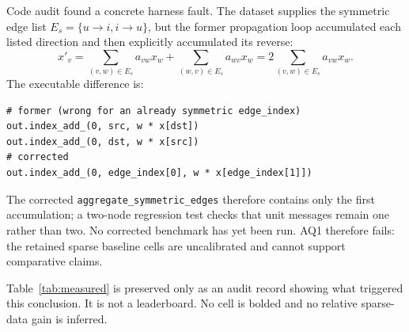 \documentclass[a4paper,fleqn,longmktitle]{cas-dc}
\begin{document}
Code audit found a concrete harness fault. The dataset supplies the symmetric
edge list $E_s=\{u\!\to\!i,i\!\to\!u\}$, but the former propagation loop
accumulated each listed direction and then explicitly accumulated its reverse:
\begin{equation}
 x'_v=\sum_{(v,w)\in E_s}a_{vw}x_w
      +\sum_{(w,v)\in E_s}a_{wv}x_w
      =2\sum_{(v,w)\in E_s}a_{vw}x_w .
 \label{eq:double-count-bug}
\end{equation}
The executable difference is:
\begin{verbatim}
# former (wrong for an already symmetric edge_index)
out.index_add_(0, src, w * x[dst])
out.index_add_(0, dst, w * x[src])
# corrected
out.index_add_(0, edge_index[0], w * x[edge_index[1]])
\end{verbatim}
The corrected \texttt{aggregate\_symmetric\_edges} therefore contains only the
first accumulation; a two-node regression test checks that unit messages
remain one rather than two. No corrected benchmark has yet been run. AQ1
therefore fails: the retained sparse baseline cells are uncalibrated and cannot
support comparative claims.

Table~\ref{tab:measured} is preserved only as an audit record showing what
triggered this conclusion. It is not a leaderboard. No cell is bolded and no
relative sparse-data gain is inferred.
\end{document}
